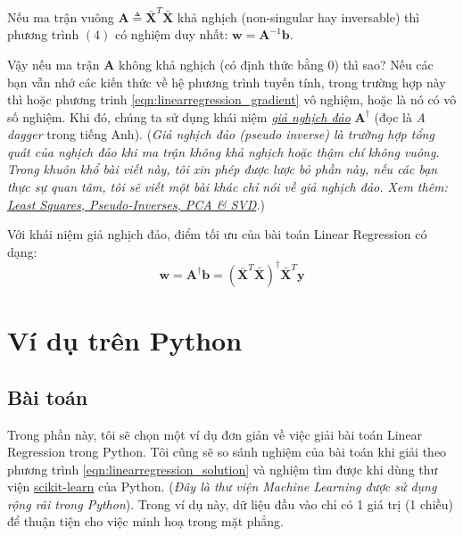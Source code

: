 Nếu ma trận vuông $ \mathbf{A} \triangleq \mathbf{\bar{X}}^T\mathbf{\bar{X}}$ khả nghịch (non-singular hay inversable) thì phương trình $(4)$ có nghiệm duy nhất: $ \mathbf{w} = \mathbf{A}^{-1}\mathbf{b}  $. 
 
Vậy nếu ma trận $\mathbf{A} $ không khả nghịch (có định thức bằng 0) thì sao? Nếu các bạn vẫn nhớ các kiến thức về hệ phương trình tuyến tính, trong trường hợp này thì hoặc phương trinh \eqref{eqn:linearregression_gradient} vô nghiệm, hoặc là nó có vô số nghiệm. Khi đó, chúng ta sử dụng khái niệm \href{https://vi.wikipedia.org/wiki/Giả_nghịch_đảo_Moore–Penrose}{\textit{giả nghịch đảo}} $ \mathbf{A}^{\dagger} $ (đọc là \textit{A dagger} trong tiếng Anh). (\textit{Giả nghịch đảo (pseudo inverse) là trường hợp tổng quát của nghịch đảo khi ma trận không khả nghịch hoặc thậm chí không vuông. Trong khuôn khổ bài viết này, tôi xin phép được lược bỏ phần này, nếu các bạn thực sự quan tâm, tôi sẽ viết một bài khác chỉ nói về giả nghịch đảo. Xem thêm: \href{http://www.sci.utah.edu/~gerig/CS6640-F2012/Materials/pseudoinverse-cis61009sl10.pdf}{Least Squares, Pseudo-Inverses, PCA \& SVD}.})
 
Với khái niệm giả nghịch đảo, điểm tối ưu của bài toán Linear Regression có dạng: 
\begin{equation}
\label{eqn:linearregression_solution}
\mathbf{w} = \mathbf{A}^{\dagger}\mathbf{b} = (\mathbf{\bar{X}}^T\mathbf{\bar{X}})^{\dagger} \mathbf{\bar{X}}^T\mathbf{y} 
\end{equation} 
 
 
 
\section{Ví dụ trên Python}
 
 
\subsection{Bài toán}
 
Trong phần này, tôi sẽ chọn một ví dụ đơn giản về việc giải bài toán Linear Regression trong Python. Tôi cũng sẽ so sánh nghiệm của bài toán khi giải theo phương trình \eqref{eqn:linearregression_solution} và nghiệm tìm được khi dùng thư viện \href{http://scikit-learn.org/stable/}{scikit-learn} của Python. (\textit{Đây là thư viện Machine Learning được sử dụng rộng rãi trong Python}). Trong ví dụ này, dữ liệu đầu vào chỉ có 1 giá trị (1 chiều) để thuận tiện cho việc minh hoạ trong mặt phẳng.  
 
